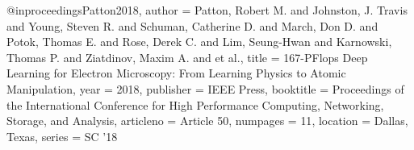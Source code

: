@inproceedings{Patton2018,
  author = {Patton, Robert M. and Johnston, J. Travis and Young, Steven R. and Schuman, Catherine D. and March, Don D. and Potok, Thomas E. and Rose, Derek C. and Lim, Seung-Hwan and Karnowski, Thomas P. and Ziatdinov, Maxim A. and et al.},
  title = {167-PFlops Deep Learning for Electron Microscopy: From Learning Physics to Atomic Manipulation},
  year = {2018},
  publisher = {IEEE Press},
  booktitle = {Proceedings of the International Conference for High Performance Computing, Networking, Storage, and Analysis},
  articleno = {Article 50},
  numpages = {11},
  location = {Dallas, Texas},
  series = {SC ’18}
}

